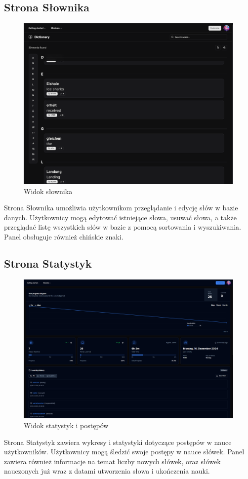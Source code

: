 \subsection{Strona Słownika}

\begin{figure}[H]
    \centering
    \includegraphics[width=1\textwidth]{IMAGE/WordBank.png}
    \caption{Widok słownika}
    \label{fig:Słownik słów}
\end{figure}
Strona Słownika umożliwia użytkownikom przeglądanie i edycję słów w bazie danych. Użytkownicy mogą  edytować istniejące słowa, usuwać słowa, a także przeglądać listę wszystkich słów w bazie z pomocą sortowania i wyszukiwania. Panel obsługuje również chińskie znaki.
\subsection{Strona Statystyk}

\begin{figure}[H]
    \centering
    \includegraphics[width=1\textwidth]{IMAGE/Progress.png}
    \caption{Widok statystyk i postępów}
    \label{fig:Statystyki postępów}
\end{figure}
Strona Statystyk zawiera wykresy i statystyki dotyczące postępów w nauce użytkowników. Użytkownicy mogą śledzić swoje postępy w nauce słówek. Panel zawiera również informacje na temat liczby nowych słówek, oraz słówek nauczonych już wraz z datami utworzenia słowa i ukończenia nauki.
